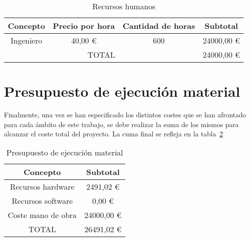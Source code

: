 \begin{table}[H]
\centering
\begin{tabular}{|c|c|c|c|}
\hline
Concepto  & Precio por hora & Cantidad de horas & Subtotal \\ \hline
Ingeniero & 40,00 \euro     & 600               & 24000,00 \euro       \\ \hline
\multicolumn{3}{|c|}{TOTAL}                     & 24000,00 \euro        \\ \hline
\end{tabular}
\caption{Recursos humanos}
\label{tab:recursos_humanos}
\end{table}

\section{Presupuesto de ejecución material}\label{sec:presupuesto-material}

Finalmente, una vez se han especificado los distintos costes que se han afrontado para cada ámbito de este trabajo, se debe realizar la suma de los mismos para alcanzar el coste total del proyecto.
La cuma final se refleja en la tabla~\ref{tab:ejec_material}

\begin{table}[H]
\centering
\begin{tabular}{|c|c|}
\hline
Concepto           & Subtotal \\ \hline
Recursos hardware  & 2491,02  \euro        \\ \hline
Recursos software  & 0,00     \euro        \\ \hline
Coste mano de obra & 24000,00 \euro        \\ \hline
TOTAL              & 26491,02 \euro        \\ \hline
\end{tabular}
\caption{Presupuesto de ejecución material}
\label{tab:ejec_material}
\end{table}

